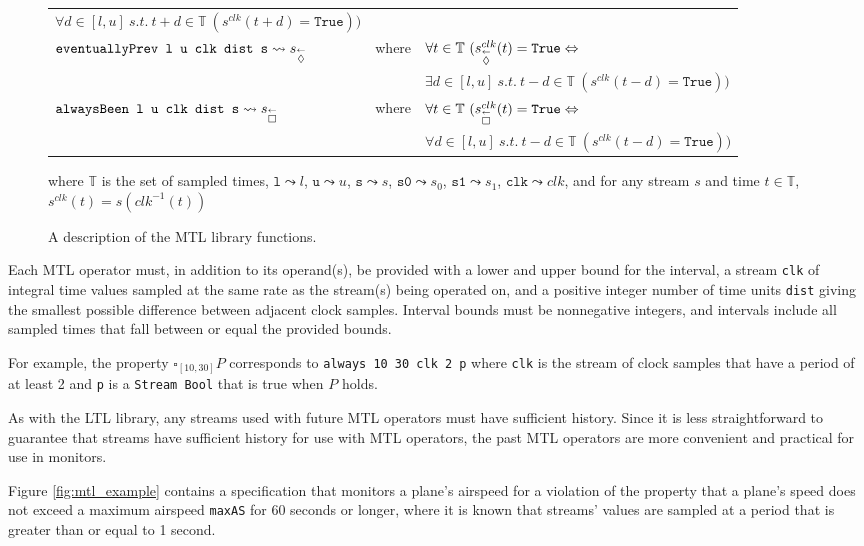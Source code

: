 \begin{figure*}[!htb]
{\begin{tabular}{l l l}
  $ \forall d \in [l,u]~s.t.~t + d \in \mathbb{T}~
    (s^{clk}(t + d) = \mathtt{True}))$\\
$\verb,eventuallyPrev l u clk dist s, \leadsto s_{\eventuallyPrev}$
  & where &
  $ \forall t \in \mathbb{T}~(s_{\overset{\leftarrow}{\lozenge}}^{clk}(t) = \mathtt{True} 
    \Leftrightarrow $ \\ & &
  $ \exists d \in [l,u]~s.t.~t - d \in \mathbb{T}~
    (s^{clk}(t - d) = \mathtt{True}))$\\
$\verb,alwaysBeen l u clk dist s, \leadsto s_{\alwaysBeen}$
  & where &
  $ \forall t \in \mathbb{T}~(s_{\overset{\leftarrow}{\square}}^{clk}(t) = \mathtt{True} 
    \Leftrightarrow $ \\ & &
  $ \forall d \in [l,u]~s.t.~t - d \in \mathbb{T}~
    (s^{clk}(t - d) = \mathtt{True}))$
\end{tabular}
}

where $\mathbb{T}$ is the set of sampled times,
$\mathtt{l} \leadsto l$, $\mathtt{u} \leadsto u$,
$\mathtt{s} \leadsto s$, $\mathtt{s0} \leadsto s_0$,
$\mathtt{s1} \leadsto s_1$, $\mathtt{clk} \leadsto clk$,
and for any stream $s$ and time
$t \in \mathbb{T}$, $s^{clk}(t) = s(clk^{-1}(t))$
\caption{A description of the MTL library functions.}
\label{fig:mtl_desc}
\end{figure*}
Each MTL operator must, in addition to its operand(s),  be provided
with a lower and upper bound for the interval, a stream {\tt clk}
of integral time values sampled at the same rate as the stream(s) being
operated on, and a positive integer number of time units {\tt dist}
giving the smallest possible difference between adjacent clock samples.
Interval bounds must be nonnegative integers, and intervals include all
sampled times that fall between or equal the provided bounds.

For example, the property $\square_{[10,30]} P$ corresponds to
\verb,always 10 30 clk 2 p,
where \verb,clk, is the stream of clock samples that have a period of
at least 2 and \verb,p, is a \verb,Stream Bool, that is true when
$P$ holds.


As with the LTL library, any streams used with future MTL operators must
have sufficient history. Since it is less straightforward to guarantee
that streams have sufficient history for use with MTL operators, the past
MTL operators are more convenient and practical for use in monitors.

Figure \ref{fig:mtl_example} contains a specification that monitors a plane's airspeed for a
violation of the property that a plane's speed does not exceed a maximum
airspeed \verb,maxAS, for 60 seconds or longer, where it is known that streams'
values are sampled at a period that is greater than or equal to 1 second.

